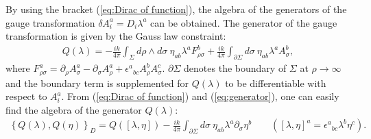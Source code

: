 \documentclass[a4paper,11pt]{article}
\begin{document}
By using the bracket (\ref{eq:Dirac of function}), the algebra of
the generators of the gauge transformation 
$\delta A_{i}^{a}= D_{i}\lambda^{a}$ can be obtained. The generator of
the gauge transformation is given by the Gauss law constraint:
\begin{eqnarray}
Q(\lambda) = -\frac{ik}{4\pi}\int_{\Sigma}\!\!d\rho\wedge d\sigma~
\eta_{ab} \lambda^{a}F_{\rho\sigma}^{b} + \frac{ik}{4\pi}
\int_{\partial\Sigma}\!\!d\sigma~\eta_{ab}\lambda^{a}A_{\sigma}^{b}, 
\label{eq:generator}
\end{eqnarray}
where $F_{\rho\sigma}^{a}=\partial_{\rho}A_{\sigma}^{a}
-\partial_{\sigma}A_{\rho}^{a}+\epsilon^{a}{}_{bc}A_{\rho}^{b}A_{\sigma}^{c}$. 
$\partial \Sigma$ denotes the boundary of $\Sigma$ at 
$\rho\rightarrow\infty$ and the boundary term is supplemented for
$Q(\lambda)$ to be differentiable with respect to $A_{i}^{a}$.
From (\ref{eq:Dirac of function}) and (\ref{eq:generator}),
one can easily find 
the algebra of the generator $Q(\lambda)$:
\begin{eqnarray}
\left\{Q(\lambda), Q(\eta)\right\}_{D}=
Q\left(\left[\lambda, \eta\right]\right) -
\frac{ik}{4\pi}\int_{\partial \Sigma}\!\!d\sigma~\eta_{ab}
\lambda^{a}\partial_{\sigma}\eta^{b} \qquad \left(\left[\lambda,
\eta\right]^{a} = \epsilon^{a}{}_{bc}\lambda^{b}\eta^{c}\right).
\end{eqnarray}
\end{document}
